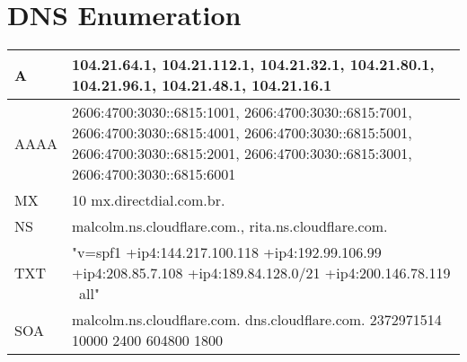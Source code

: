 
\section{DNS Enumeration}
\begin{tabularx}{\textwidth}{|l|X|}
\hline
A & 104.21.64.1, 104.21.112.1, 104.21.32.1, 104.21.80.1, 104.21.96.1, 104.21.48.1, 104.21.16.1 \\ \hline
AAAA & 2606:4700:3030::6815:1001, 2606:4700:3030::6815:7001, 2606:4700:3030::6815:4001, 2606:4700:3030::6815:5001, 2606:4700:3030::6815:2001, 2606:4700:3030::6815:3001, 2606:4700:3030::6815:6001 \\ \hline
MX & 10 mx.directdial.com.br. \\ \hline
NS & malcolm.ns.cloudflare.com., rita.ns.cloudflare.com. \\ \hline
TXT & "v=spf1 +ip4:144.217.100.118 +ip4:192.99.106.99 +ip4:208.85.7.108  +ip4:189.84.128.0/21 +ip4:200.146.78.119 ~all" \\ \hline
SOA & malcolm.ns.cloudflare.com. dns.cloudflare.com. 2372971514 10000 2400 604800 1800 \\ \hline
\end{tabularx}
